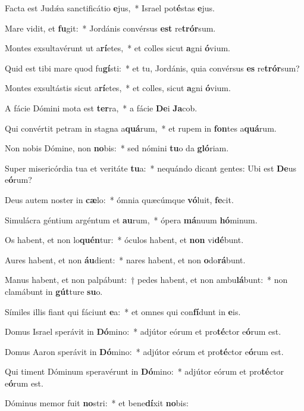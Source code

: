 \item Facta est Judǽa sanctificátio \textbf{e}jus,~* Israel pot\textbf{é}stas \textbf{e}jus.
\item Mare vidit, et \textbf{fu}git:~* Jordánis convérsus \textbf{est} re\textbf{trór}sum.
\item Montes exsultavérunt ut a\textbf{rí}etes,~* et colles sicut \textbf{a}gni \textbf{ó}vium.
\item Quid est tibi mare quod fu\textbf{gí}sti:~* et tu, Jordánis, quia convérsus \textbf{es} re\textbf{trór}sum?
\item Montes exsultástis sicut a\textbf{rí}etes,~* et colles, sicut \textbf{a}gni \textbf{ó}vium.
\item A fácie Dómini mota est \textbf{ter}ra,~* a fácie \textbf{De}i \textbf{Ja}cob.
\item Qui convértit petram in stagna a\textbf{quá}rum,~* et rupem in \textbf{fon}tes a\textbf{quá}rum.
\item Non nobis Dómine, non \textbf{no}bis:~* sed nómini \textbf{tu}o da \textbf{gló}riam.
\item Super misericórdia tua et veritáte \textbf{tu}a:~* nequándo dicant gentes: Ubi est \textbf{De}us e\textbf{ó}rum?
\item Deus autem noster in \textbf{cæ}lo:~* ómnia quæcúmque \textbf{vó}luit, \textbf{fe}cit.
\item Simulácra géntium argéntum et \textbf{au}rum,~* ópera \textbf{má}nuum \textbf{hó}minum.
\item Os habent, et non lo\textbf{quén}tur:~* óculos habent, et \textbf{non} vi\textbf{dé}bunt.
\item Aures habent, et non \textbf{áu}dient:~* nares habent, et non \textbf{o}do\textbf{rá}bunt.
\item Manus habent, et non palpábunt:~† pedes habent, et non ambu\textbf{lá}bunt:~* non clamábunt in \textbf{gút}ture \textbf{su}o.
\item Símiles illis fiant qui fáciunt \textbf{e}a:~* et omnes qui con\textbf{fí}dunt in \textbf{e}is.
\item Domus Israel sperávit in \textbf{Dó}mino:~* adjútor eórum et pro\textbf{té}ctor e\textbf{ó}rum est.
\item Domus Aaron sperávit in \textbf{Dó}mino:~* adjútor eórum et pro\textbf{té}ctor e\textbf{ó}rum est.
\item Qui timent Dóminum speravérunt in \textbf{Dó}mino:~* adjútor eórum et pro\textbf{té}ctor e\textbf{ó}rum est.
\item Dóminus memor fuit \textbf{no}stri:~* et bene\textbf{dí}xit \textbf{no}bis:
